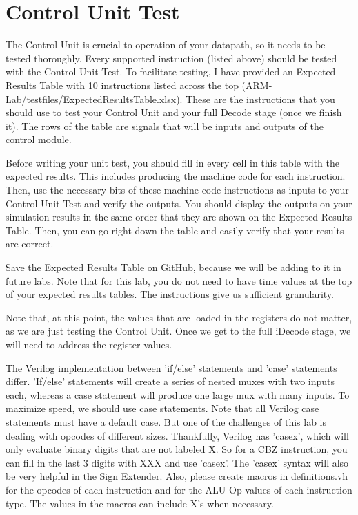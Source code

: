 \section{Control Unit Test}
The Control Unit is crucial to operation of your datapath, so it needs to be tested thoroughly.  Every supported instruction (listed above) should be tested with the Control Unit Test.  To facilitate testing, I have provided an Expected Results Table with 10 instructions listed across the top (ARM-Lab/testfiles/ExpectedResultsTable.xlsx).  These are the instructions that you should use to test your Control Unit and your full Decode stage (once we finish it).  The rows of the table are signals that will be inputs and outputs of the control module.  

Before writing your unit test, you should fill in every cell in this table with the expected results.  This includes producing the machine code for each instruction.  Then, use the necessary bits of these machine code instructions as inputs to your Control Unit Test and verify the outputs.  You should display the outputs on your simulation results in the same order that they are shown on the Expected Results Table.  Then, you can go right down the table and easily verify that your results are correct.  

Save the Expected Results Table on GitHub, because we will be adding to it in future labs.  Note that for this lab, you do not need to have time values at the top of your expected results tables.  The instructions give us sufficient granularity.

Note that, at this point, the values that are loaded in the registers do not matter, as we are just testing the Control Unit.  Once we get to the full iDecode stage, we will need to address the register values.

The Verilog implementation between 'if/else' statements and 'case' statements differ.  'If/else' statements will create a series of nested muxes with two inputs each, whereas a case statement will produce one large mux with many inputs.  To maximize speed, we should use case statements. Note that all Verilog case statements must have a default case. But one of the challenges of this lab is dealing with opcodes of different sizes.  Thankfully, Verilog has 'casex', which will only evaluate binary digits that are not labeled X.  So for a CBZ instruction, you can fill in the last 3 digits with XXX and use 'casex'.  The 'casex' syntax will also be very helpful in the Sign Extender.  Also, please create macros in definitions.vh for the opcodes of each instruction and for the ALU Op values of each instruction type.  The values in the macros can include X's when necessary.

